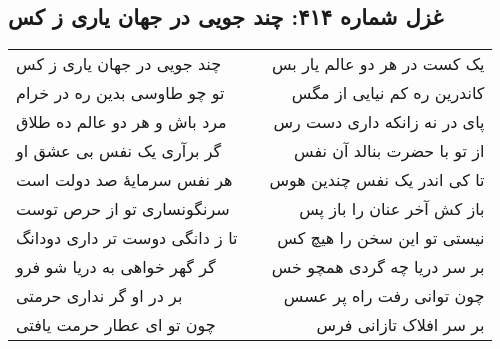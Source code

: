 \begin{center}
\section*{غزل شماره ۴۱۴: چند جویی در جهان یاری ز کس}
\label{sec:414}
\begin{longtable}{l p{0.5cm} r}
چند جویی در جهان یاری ز کس
&&
یک کست در هر دو عالم یار بس
\\
تو چو طاوسی بدین ره در خرام
&&
کاندرین ره کم نیایی از مگس
\\
مرد باش و هر دو عالم ده طلاق
&&
پای در نه زانکه داری دست رس
\\
گر برآری یک نفس بی عشق او
&&
از تو با حضرت بنالد آن نفس
\\
هر نفس سرمایهٔ صد دولت است
&&
تا کی اندر یک نفس چندین هوس
\\
سرنگونساری تو از حرص توست
&&
باز کش آخر عنان را باز پس
\\
تا ز دانگی دوست تر داری دودانگ
&&
نیستی تو این سخن را هیچ کس
\\
گر گهر خواهی به دریا شو فرو
&&
بر سر دریا چه گردی همچو خس
\\
بر در او گر نداری حرمتی
&&
چون توانی رفت راه پر عسس
\\
چون تو ای عطار حرمت یافتی
&&
بر سر افلاک تازانی فرس
\\
\end{longtable}
\end{center}
